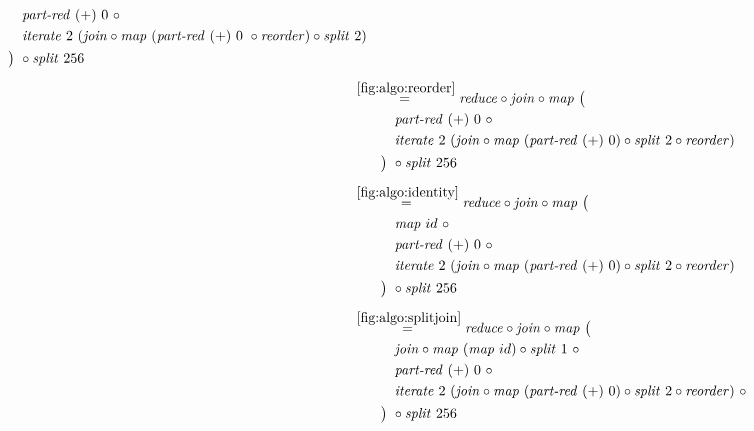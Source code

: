 \begin{figure*}[t]
\begin{align*}
\begin{aligned}
    &\qquad\quad\partRed\ (+)\ 0\ \circ\\
    &\qquad\quad\iterateN\ 2\ (\join \circ \map\ (\partRed\ (+)\ 0\ \circ \reorder) \circ \splitN\ 2)\\
    &\qquad\big)\ \circ \splitN\ 256
  \end{aligned}\\[.5em]
%
  &\hspace{-2em}\quad\begin{aligned}
    &\overset{\ref{fig:algo:reorder}}{=\hspace{.2em}}
      \reduce \circ \join \circ \map\ \big(\\
    &\qquad\quad\partRed\ (+)\ 0\ \circ\\
    &\qquad\quad\iterateN\ 2\ (\join \circ \map\ (\partRed\ (+)\ 0) \circ \splitN\ 2\circ \reorder)\\
    &\qquad\big)\ \circ \splitN\ 256
  \end{aligned}\\[.5em]
%
  &\hspace{-2em}\quad\begin{aligned}
    &\overset{\ref{fig:algo:identity}}{=\hspace{.2em}}
      \reduce \circ \join \circ \map\ \big(\\
    &\qquad\quad\map\ id\ \circ \\
    &\qquad\quad\partRed\ (+)\ 0\ \circ\\
    &\qquad\quad\iterateN\ 2\ (\join \circ \map\ (\partRed\ (+)\ 0) \circ \splitN\ 2\circ \reorder)\\
    &\qquad\big)\ \circ \splitN\ 256
  \end{aligned}\\[.5em]
%
  &\hspace{-2em}\quad\begin{aligned}
    &\overset{\ref{fig:algo:splitjoin}}{=\hspace{.2em}}
      \reduce \circ \join \circ \map\ \big(\\
    &\qquad\quad\join \circ \map\ (\map\ id) \circ \splitN\ 1\ \circ\\
    &\qquad\quad\partRed\ (+)\ 0\ \circ\\
    &\qquad\quad\iterateN\ 2\ (\join \circ \map\ (\partRed\ (+)\ 0) \circ \splitN\ 2\circ \reorder)\ \circ\\
    &\qquad\big)\ \circ \splitN\ 256
  \end{aligned}\\[.5em]
%
  &\hspace{-2em}\quad\begin{aligned}

\end{aligned}
\end{align*}
\end{figure*}
